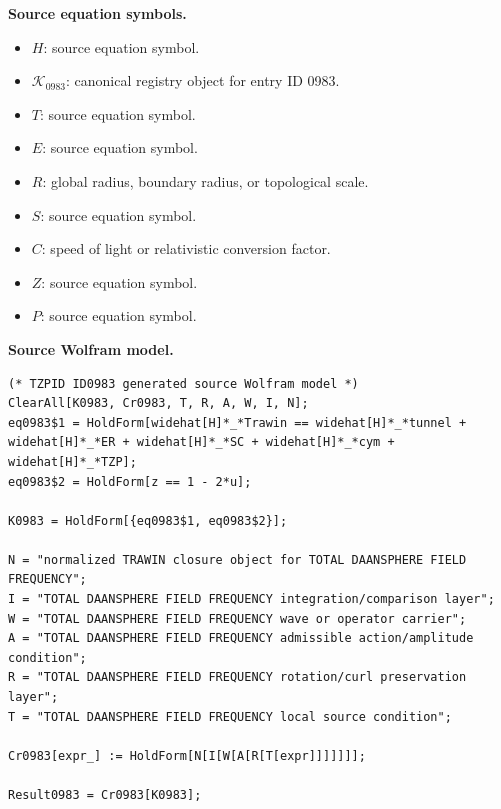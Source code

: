 \begin{minipage}[t]{0.49\linewidth}
\begingroup
\small
\raggedright
\textbf{Source equation symbols.}\par
\begin{itemize}[leftmargin=1.35em,itemsep=1pt,topsep=1pt,parsep=0pt]
    \item $H$: source equation symbol.
    \item $\mathcal{K}_{0983}$: canonical registry object for entry ID 0983.
    \item $T$: source equation symbol.
    \item $E$: source equation symbol.
    \item $R$: global radius, boundary radius, or topological scale.
    \item $S$: source equation symbol.
    \item $C$: speed of light or relativistic conversion factor.
    \item $Z$: source equation symbol.
    \item $P$: source equation symbol.
\end{itemize}
\endgroup
\end{minipage}\hfill
\begin{minipage}[t]{0.47\linewidth}
\begingroup
\scriptsize
\raggedright
\textbf{Source Wolfram model.}\par
\begin{Verbatim}[fontsize=\tiny,breaklines=true,breakanywhere=true]
(* TZPID ID0983 generated source Wolfram model *)
ClearAll[K0983, Cr0983, T, R, A, W, I, N];
eq0983$1 = HoldForm[widehat[H]*_*Trawin == widehat[H]*_*tunnel + widehat[H]*_*ER + widehat[H]*_*SC + widehat[H]*_*cym + widehat[H]*_*TZP];
eq0983$2 = HoldForm[z == 1 - 2*u];

K0983 = HoldForm[{eq0983$1, eq0983$2}];

N = "normalized TRAWIN closure object for TOTAL DAANSPHERE FIELD FREQUENCY";
I = "TOTAL DAANSPHERE FIELD FREQUENCY integration/comparison layer";
W = "TOTAL DAANSPHERE FIELD FREQUENCY wave or operator carrier";
A = "TOTAL DAANSPHERE FIELD FREQUENCY admissible action/amplitude condition";
R = "TOTAL DAANSPHERE FIELD FREQUENCY rotation/curl preservation layer";
T = "TOTAL DAANSPHERE FIELD FREQUENCY local source condition";

Cr0983[expr_] := HoldForm[N[I[W[A[R[T[expr]]]]]]];

Result0983 = Cr0983[K0983];
\end{Verbatim}
\endgroup
\end{minipage}


